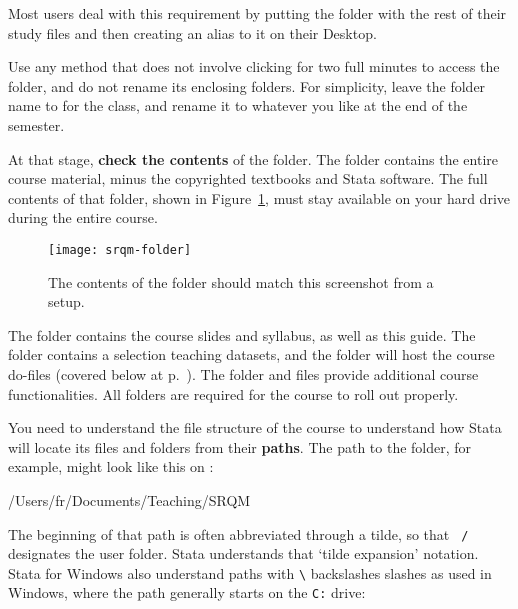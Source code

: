 	 Most users deal with this requirement by putting the \SRQM folder with the rest of their study files and then creating an alias to it on their Desktop.%
	
	Use any method that does not involve clicking for two full minutes to access the \SRQM folder, and do not rename its enclosing folders. For simplicity, leave the folder name to \SRQM for the class, and rename it to whatever you like at the end of the semester.%
	
	At that stage, \textbf{check the contents} of the \SRQM folder. The \SRQM folder contains the entire course material, minus the copyrighted textbooks and Stata software. The full contents of that folder, shown in Figure~\ref{fig:srqm-folder}, must stay available on your hard drive during the entire course.%

		\begin{figure}%
		  \texttt{[image: srqm-folder]}
      
		  \caption{The contents of the \SRQM folder should match %
			this screenshot from a \OSX setup.}
		    \label{fig:srqm-folder}
		\end{figure}
		
	The \course folder contains the course slides and syllabus, as well as this guide. The \data folder contains a selection teaching datasets, and the \code folder will host the course do-files (covered below at p.~\pageref{sec:do-files}). The \setup folder and  files provide additional course functionalities. All folders are required for the course to roll out properly.%

	You need to understand the file structure of the course to understand how Stata will locate its files and folders from their \textbf{paths}. The path to the \SRQM folder, for example, might look like this on \OSX:\\[1em]%
	
	\begin{docspec}
		/Users/fr/Documents/Teaching/SRQM
	\end{docspec}
	
	The beginning of that path is often abbreviated through a tilde, so that \texttt{~/} designates the user folder. Stata understands that `tilde expansion' notation. Stata for Windows also understand paths with \texttt{\textbackslash} backslashes slashes as used in Windows, where the path generally starts on the \texttt{C:} drive:%

